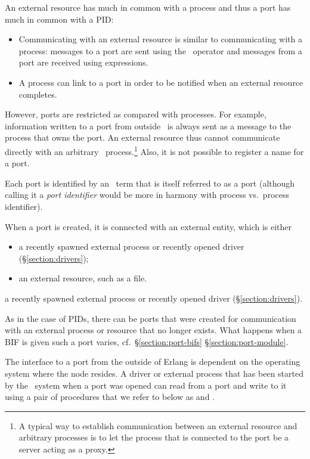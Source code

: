 An external resource has much in common with a process and thus a
port has much in common with a PID:
\begin{itemize}
\item Communicating with an external resource is similar to communicating
with a process: messages to a port are sent using the \T{!}\ operator and
messages from a port are received using  expressions.

\item {}
A process can link to a port in order to be notified when an
external resource completes.
\end{itemize}
However, ports are restricted as compared with processes.
For example, information written to a port from outside \Erlang\ is always sent
as a message to the process that owns the port.
An external resource thus cannot communicate directly
with an arbitrary \Erlang\ process.\footnote{A typical way to establish
communication between an external resource and arbitrary processes is
to let the process that is connected to the port be a server acting
as a proxy.}  Also, it is not possible to
register a name for a port.

Each port is identified by an \Erlang\ term that is itself referred to
as a port (although calling it a \emph{port identifier} would be more
in harmony with process vs.\ process identifier).

When a port is created, it is connected with an external entity, which
is
\ifOld
either
\begin{itemize}
\item a recently spawned external process or recently opened driver
(\S\ref{section:drivers});
\item an external resource, such as a file.
\end{itemize}
\fi
\ifStd
a recently spawned external process or recently opened driver
(\S\ref{section:drivers}).
\fi

As in the case of PIDs, there can be ports that were created for communication
with an external process or resource that no longer exists.
What happens when a BIF is given such a port varies, cf.\
\ifOld\S\ref{section:port-bifs}\fi
\ifStd\S\ref{section:port-module}\fi.

The interface to a port from the outside of Erlang is dependent on the operating
system where the node resides.  A driver or external process that has been
started by the \Erlang\ system when a port was opened can read from a port and write
to it using a pair of procedures that we refer to below as \I{read} and \I{write}.

